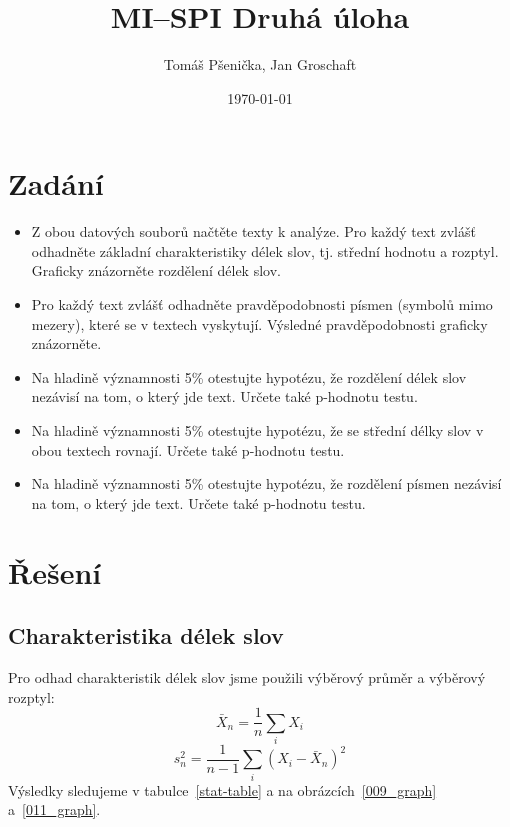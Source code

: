 \documentclass[12pt]{article}
\title{MI--SPI Druhá úloha}
\author{Tomáš Pšenička, Jan Groschaft}
\date{\today}
\begin{document}
 
\begin{titlingpage}
	\maketitle
\end{titlingpage}
 	
	\newpage
 
	\tableofcontents

	\newpage

 	\section{Zadání}
 	
 	\begin{itemize}
 		\item Z obou datových souborů načtěte texty k analýze. Pro každý text zvlášť odhadněte základní charakteristiky délek slov, tj. střední hodnotu a rozptyl. Graficky znázorněte rozdělení délek slov.
  		\item Pro každý text zvlášť odhadněte pravděpodobnosti písmen (symbolů mimo mezery), které se v textech vyskytují. Výsledné pravděpodobnosti graficky znázorněte.
 		\item Na hladině významnosti 5\% otestujte hypotézu, že rozdělení délek slov nezávisí na tom, o který jde text. Určete také p-hodnotu testu. 		
 		\item Na hladině významnosti 5\% otestujte hypotézu, že se střední délky slov v obou textech rovnají. Určete také p-hodnotu testu.
		\item Na hladině významnosti 5\% otestujte hypotézu, že rozdělení písmen nezávisí na tom, o který jde text. Určete také p-hodnotu testu.
 	\end{itemize}
   		
   		
	\section{Řešení}\label{r}
		\subsection{Charakteristika délek slov}\label{pz}
            Pro odhad charakteristik délek slov jsme použili výběrový průměr a výběrový rozptyl: 
               $$\bar{X}_n = \frac{1}{n} \sum_{i}{X_i}$$   					
               $$s_n^2 = \frac{1}{n-1} \sum_{i}{(X_i - \bar{X}_n)^2}$$   					
            Výsledky sledujeme v tabulce~\ref{stat-table} a na obrázcích~\ref{009_graph} a~\ref{011_graph}. 
\end{document}
